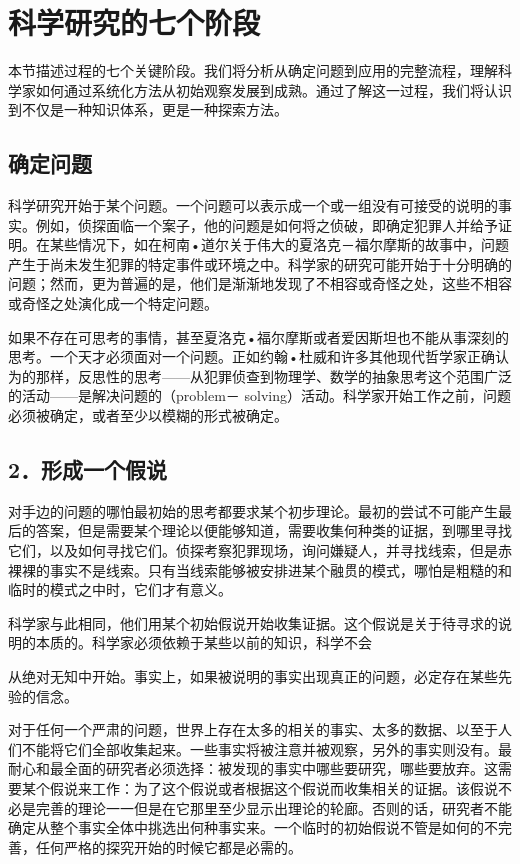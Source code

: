 \section{科学研究的七个阶段}

\begin{logicbox}[title=引言]
本节描述过程的七个关键阶段。我们将分析从确定问题到应用的完整流程，理解科学家如何通过系统化方法从初始观察发展到成熟。通过了解这一过程，我们将认识到不仅是一种知识体系，更是一种探索方法。
\end{logicbox}

\subsection{确定问题}
科学研究开始于某个问题。一个问题可以表示成一个或一组没有可接受的说明的事实。例如，侦探面临一个案子，他的问题是如何将之侦破，即确定犯罪人并给予证明。在某些情况下，如在柯南•道尔关于伟大的夏洛克－福尔摩斯的故事中，问题产生于尚未发生犯罪的特定事件或环境之中。科学家的研究可能开始于十分明确的问题；然而，更为普遍的是，他们是渐渐地发现了不相容或奇怪之处，这些不相容或奇怪之处演化成一个特定问题。

如果不存在可思考的事情，甚至夏洛克•福尔摩斯或者爱因斯坦也不能从事深刻的思考。一个天才必须面对一个问题。正如约翰•杜威和许多其他现代哲学家正确认为的那样，反思性的思考——从犯罪侦查到物理学、数学的抽象思考这个范围广泛的活动——是解决问题的（problem－ solving）活动。科学家开始工作之前，问题必须被确定，或者至少以模糊的形式被确定。

\subsection{2．形成一个假说}
对手边的问题的哪怕最初始的思考都要求某个初步理论。最初的尝试不可能产生最后的答案，但是需要某个理论以便能够知道，需要收集何种类的证据，到哪里寻找它们，以及如何寻找它们。侦探考察犯罪现场，询问嫌疑人，并寻找线索，但是赤裸裸的事实不是线索。只有当线索能够被安排进某个融贯的模式，哪怕是粗糙的和临时的模式之中时，它们才有意义。

科学家与此相同，他们用某个初始假说开始收集证据。这个假说是关于待寻求的说明的本质的。科学家必须依赖于某些以前的知识，科学不会

从绝对无知中开始。事实上，如果被说明的事实出现真正的问题，必定存在某些先验的信念。

对于任何一个严肃的问题，世界上存在太多的相关的事实、太多的数据、以至于人们不能将它们全部收集起来。一些事实将被注意并被观察，另外的事实则没有。最耐心和最全面的研究者必须选择：被发现的事实中哪些要研究，哪些要放弃。这需要某个假说来工作：为了这个假说或者根据这个假说而收集相关的证据。该假说不必是完善的理论一一但是在它那里至少显示出理论的轮廊。否则的话，研究者不能确定从整个事实全体中挑选出何种事实来。一个临时的初始假说不管是如何的不完善，任何严格的探究开始的时候它都是必需的。

